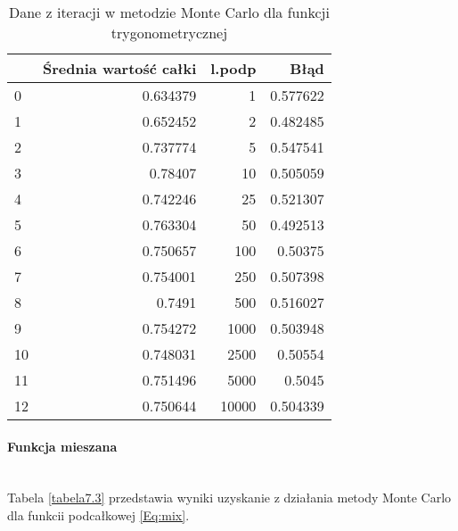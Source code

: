 \documentclass[12pt,twoside]{article}
\begin{document}
\begin{table}[H]
\centering 
\caption{Dane z iteracji w metodzie Monte Carlo dla funkcji trygonometrycznej}
\label{tabela7.2}
\begin{tabular}{lrrr}
\toprule
{} &  Średnia wartość całki &  l.podp &      Błąd \\
\midrule
0  &               0.634379 &       1 &  0.577622 \\
1  &               0.652452 &       2 &  0.482485 \\
2  &               0.737774 &       5 &  0.547541 \\
3  &                0.78407 &      10 &  0.505059 \\
4  &               0.742246 &      25 &  0.521307 \\
5  &               0.763304 &      50 &  0.492513 \\
6  &               0.750657 &     100 &  0.50375 \\
7  &               0.754001 &     250 &  0.507398 \\
8  &                 0.7491 &     500 &  0.516027 \\
9  &               0.754272 &    1000 &  0.503948 \\
10 &               0.748031 &    2500 &  0.50554 \\
11 &               0.751496 &    5000 &  0.5045 \\
12 &               0.750644 &   10000 &  0.504339 \\
\bottomrule
\end{tabular}
\end{table}

\paragraph{Funkcja mieszana}\mbox{} \\

Tabela \eqref{tabela7.3} przedstawia wyniki uzyskanie z działania metody Monte Carlo dla funkcii podcałkowej \eqref{Eq:mix}.
\end{document}
